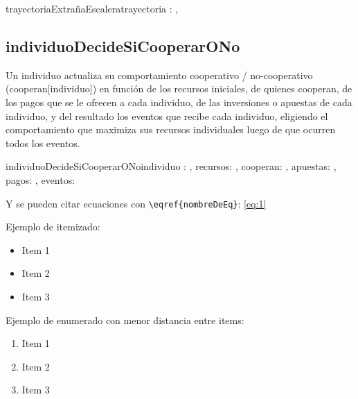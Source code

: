 \documentclass[10pt,a4paper]{article}
\begin{document}
\begin{proc}{trayectoriaExtrañaEscalera}{\In trayectoria : \TLista{\float},}{\bool}


\end{proc}

\subsection{individuoDecideSiCooperarONo}

Un individuo actualiza su comportamiento cooperativo / no-cooperativo
(cooperan[individuo]) en función de los recursos iniciales, de quienes cooperan, de los pagos que se le ofrecen a cada
individuo, de las inversiones o apuestas de cada individuo, y del resultado los eventos que recibe cada individuo,
eligiendo el comportamiento que maximiza sus recursos individuales luego de que ocurren todos los eventos.



\begin{proc}{individuoDecideSiCooperarONo}{\In individuo : {\nat}, \In recursos: \TLista{\float}, \Inout cooperan: \TLista{\bool}, \In apuestas: \TLista{\TLista{\float}}, \In pagos: \TLista{\TLista{\float}}, \In eventos: \TLista{\TLista{\nat}}}{\bool}
	\requiere{}
	\asegura{}


\end{proc}

Y se pueden citar ecuaciones con \verb|\eqref{nombreDeEq}|: \eqref{eq:1}

Ejemplo de itemizado:

\begin{itemize}
	\item Item 1
	\item Item 2
	\item Item 3
\end{itemize}

Ejemplo de enumerado con menor distancia entre items:

\begin{enumerate} \setlength\itemsep{0cm}
	\item Item 1
	\item Item 2
	\item Item 3
\end{enumerate}
\end{document}
